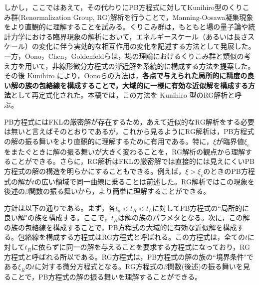 \documentclass[11pt,a4paper]{ltjsarticle}
\theoremstyle{definition}
\theoremstyle{remark}
\begin{document}
しかし，ここではあえて，その代わりにPB方程式に対してKunihiro型のくりこみ群(Renormalization Group, RG)解析を行うことで，Manning-Oosawa凝集現象をより直観的に理解することを試みる。くりこみ群は，もともと場の量子論や統計力学における臨界現象の解析において，エネルギースケール（あるいは長さスケール）の変化に伴う実効的な相互作用の変化を記述する方法として発展した。一方，Oono，Chen，Goldenfeldらは，場の理論におけるくりこみ群と類似の考え方を用いて，非線形微分方程式の漸近解を系統的に構成する方法を提案した\cite{ChenGoldenfeldOono1994,GoldenfeldOono1996}。その後 Kunihiro により，Oonoらの方法は，\textbf{各点で与えられた局所的に精度の良い解の族の包絡線を構成することで，大域的に一様に有効な近似解を構成する方法}として再定式化された\cite{Kunihiro1995,Kunihiro1997}。本稿では，この方法を Kunihiro 型のRG解析と呼ぶ。

PB方程式にはFKLの厳密解が存在するため，あえて近似的なRG解析をする必要は無いと言えばそのとおりであるが，これから見るようにRG解析は，PB方程式の解の振る舞いをより直観的に理解するために有用である。特に，$\xi$が臨界値$\xi_c$をまたぐときに解の振る舞いが大きく変わることを，RG解析の観点から理解することができる。さらに，RG解析はFKLの厳密解では直接的には見えにくいPB方程式の解の構造を明らかにすることもできる。例えば，$\xi>\xi_c$のときのPB方程式の解が$t$の広い領域で同一曲線に乗ることは前述した。RG解析ではこの現象を後述の$\beta$関数の振る舞いから，より簡単に理解することができる。

方針は以下の通りである。まず，各$t_a<t_R<t_L$に対してPB方程式の``局所的に良い解"の族を構成する。ここで，$t_R$は解の族のパラメタとなる。次に，この解の族の包絡線を構成することで，PB方程式の大域的に有効な近似解を構成する。包絡線を構成する方程式はRG方程式と呼ばれる。この方程式は，全ての$t$に対して$t_R$に依らずに同一の解を与えることを要求する方程式になっており，RG方程式と呼ばれる所以である。RG方程式は，PB方程式の解の族の``境界条件"である$\xi_R$の$t$に対する微分方程式となる。RG方程式の$\beta$関数(後述)の振る舞いを見ることで，PB方程式の解の振る舞いを理解することができる。
\end{document}
